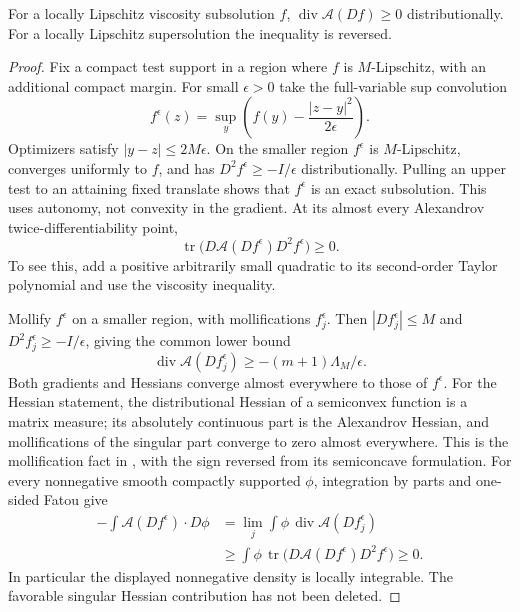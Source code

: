 \begin{lemma}\label{lem:flux-weak}
For a locally Lipschitz viscosity subsolution $f$,
$\operatorname{div}\mathcal A(Df)\geq0$ distributionally.
For a locally Lipschitz supersolution the inequality is reversed.
\end{lemma}
\begin{proof}
Fix a compact test support in a region where $f$ is $M$-Lipschitz,
with an additional compact margin. For small $\epsilon>0$ take the
full-variable sup convolution
\[
 f^\epsilon(z)=\sup_y\left(f(y)-\frac{|z-y|^2}{2\epsilon}\right).
\]
Optimizers satisfy $|y-z|\leq2M\epsilon$. On the smaller region
$f^\epsilon$ is $M$-Lipschitz, converges uniformly to $f$, and has
$D^2f^\epsilon\geq-I/\epsilon$ distributionally. Pulling an upper
test to an attaining fixed translate shows that $f^\epsilon$ is an
exact subsolution. This uses autonomy, not convexity in the gradient.
At its almost every Alexandrov twice-differentiability point,
\[
 \operatorname{tr}\bigl(D\mathcal A(Df^\epsilon)D^2f^\epsilon\bigr)
 \geq0.
\]
To see this, add a positive arbitrarily small quadratic to its
second-order Taylor polynomial and use the viscosity inequality.

Mollify $f^\epsilon$ on a smaller region, with mollifications
$f_j^\epsilon$. Then $|Df_j^\epsilon|\leq M$ and
$D^2f_j^\epsilon\geq-I/\epsilon$, giving the common lower bound
\[
 \operatorname{div}\mathcal A(Df_j^\epsilon)
 \geq-(m+1)\Lambda_M/\epsilon.
\]
Both gradients and Hessians converge almost everywhere to those of
$f^\epsilon$. For the Hessian statement, the distributional Hessian
of a semiconvex function is a matrix measure; its absolutely continuous
part is the Alexandrov Hessian, and mollifications of the singular part
converge to zero almost everywhere. This is the mollification fact in
\cite[Remark 3.3]{JulinJuutinen}, with the sign reversed from its
semiconcave formulation. For every nonnegative smooth compactly
supported $\phi$, integration by parts and one-sided Fatou give
\[
 \begin{split}
 -\int\mathcal A(Df^\epsilon)\cdot D\phi
 &=\lim_j\int\phi\,\operatorname{div}\mathcal A(Df_j^\epsilon)\\
 &\geq\int\phi\,
 \operatorname{tr}\bigl(D\mathcal A(Df^\epsilon)D^2f^\epsilon\bigr)
 \geq0.
 \end{split}
\]
In particular the displayed nonnegative density is locally integrable.
The favorable singular Hessian contribution has not been deleted.


\end{proof}
